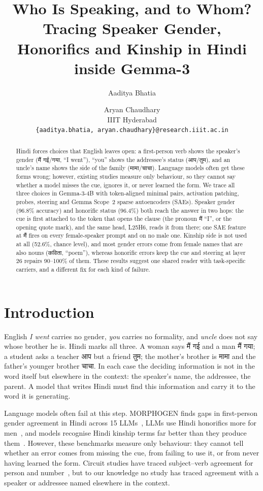 \documentclass[11pt]{article}
\title{Who Is Speaking, and to Whom? \\
Tracing Speaker Gender, Honorifics and Kinship in Hindi inside Gemma-3}
\author{Aaditya Bhatia \and Aryan Chaudhary \\
  IIIT Hyderabad \\
  \texttt{\{aaditya.bhatia, aryan.chaudhary\}@research.iiit.ac.in}}
\newcommand{\hi}[1]{{\devfont #1}}
\newcommand{\main}{\hi{मैं}}  %
\newcommand{\aap}{\hi{आप}}
\newcommand{\tum}{\hi{तुम}}
\begin{document}
\maketitle

\begin{abstract}
Hindi forces choices that English leaves open: a first-person verb shows the speaker's gender (\hi{मैं गई}/\hi{गया}, ``I went''), ``you'' shows the addressee's status (\aap{}/\tum{}), and an uncle's name shows the side of the family (\hi{मामा}/\hi{चाचा}). Language models often get these forms wrong; however, existing studies measure only behaviour, so they cannot say whether a model misses the cue, ignores it, or never learned the form. We trace all three choices in Gemma-3-4B with token-aligned minimal pairs, activation patching, probes, steering and Gemma Scope~2 sparse autoencoders (SAEs). Speaker gender (96.8\% accuracy) and honorific status (96.4\%) both reach the answer in two hops: the cue is first attached to the token that opens the clause (the pronoun \main{} ``I'', or the opening quote mark), and the same head, L25H6, reads it from there; one SAE feature at \main{} fires on every female-speaker prompt and on no male one. Kinship side is not used at all (52.6\%, chance level), and most gender errors come from female names that are also nouns (\hi{कविता}, ``poem''), whereas honorific errors keep the cue and steering at layer 26 repairs 90--100\% of them. These results suggest one shared reader with task-specific carriers, and a different fix for each kind of failure.
\end{abstract}

\section{Introduction}

English \emph{I went} carries no gender, \emph{you} carries no formality, and \emph{uncle} does not say whose brother he is. Hindi marks all three. A woman says \hi{मैं गई} and a man \hi{मैं गया}; a student asks a teacher \aap{} but a friend \tum{}; the mother's brother is \hi{मामा} and the father's younger brother \hi{चाचा}. In each case the deciding information is not in the word itself but elsewhere in the context: the speaker's name, the addressee, the parent. A model that writes Hindi must find this information and carry it to the word it is generating.

Language models often fail at this step. MORPHOGEN finds gaps in first-person gender agreement in Hindi across 15 LLMs~\cite{morphogen2026}, LLMs use Hindi honorifics more for men~\cite{honorific2025}, and models recognise Hindi kinship terms far better than they produce them~\cite{pardasani2026}. However, these benchmarks measure only behaviour: they cannot tell whether an error comes from missing the cue, from failing to use it, or from never having learned the form. Circuit studies have traced subject--verb agreement for person and number~\cite{ferrando2024,gidi2026}, but to our knowledge no study has traced agreement with a speaker or addressee named elsewhere in the context.
\end{document}

